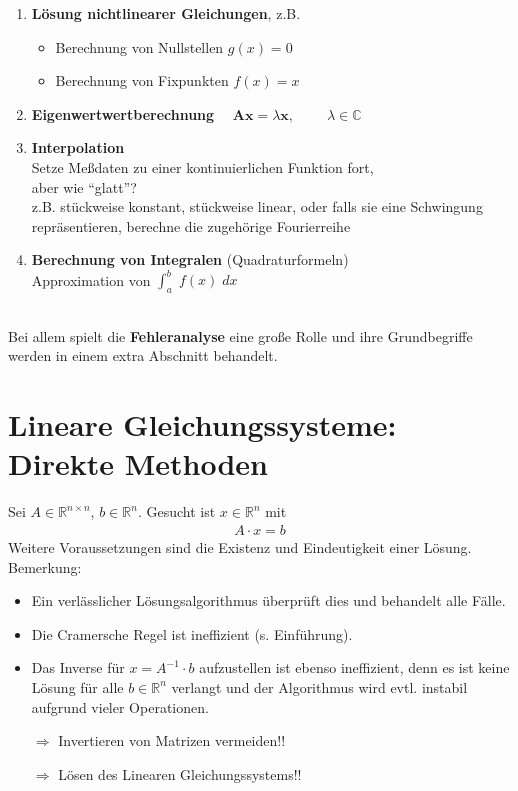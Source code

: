 \documentclass[ngerman,fontsize=11pt, paper=a4, parskip=half, titlepage=true, toc=bib]{scrbook}
\newcommand{\R}{\mathds{R}}
\begin{document}
\begin{enumerate}
  		\item \textbf{Lösung nichtlinearer Gleichungen},
  		z.B.
  		\begin{itemize}
  			\item Berechnung von Nullstellen $g(x) = 0$
  			\item Berechnung von Fixpunkten $f(x) = x$
  			\end{itemize}  
  			\item \textbf{Eigenwertwertberechnung}
  			 $\quad \boldsymbol A \boldsymbol x =   \lambda \boldsymbol x, \qquad \; \lambda \in \mathbb{C}$
  		
  			
  		\item \textbf{Interpolation}\\
  		Setze Meßdaten zu einer kontinuierlichen Funktion fort, \\
  		aber wie \enquote{glatt}?\\
  		z.B. stückweise konstant, stückweise linear, oder 
  		falls sie
  		eine Schwingung repräsentieren, berechne die zugehörige
  		Fourierreihe  
  		
  		\item \textbf{Berechnung von Integralen} (Quadraturformeln) \\ 
  		Approximation von $\int_a^b \; f(x) \; dx$
  	\end{enumerate}~\\
  	
  	Bei allem spielt die \textbf{Fehleranalyse} eine große Rolle und
  	ihre Grundbegriffe werden in einem extra Abschnitt behandelt.
  	

\chapter{Lineare Gleichungssysteme: Direkte Methoden}
Sei $ A \in \R^{n\times n}$, $b \in \R^n$. Gesucht ist $x\in \R^n$ mit 
\begin{gather*}
	A\cdot x = b
\end{gather*}
Weitere Voraussetzungen sind die Existenz und Eindeutigkeit einer Lösung.
Bemerkung:
\begin{itemize}
	\item Ein verlässlicher Lösungsalgorithmus überprüft dies und behandelt alle Fälle. 
	\item Die Cramersche Regel ist ineffizient (s. Einführung).
	\item Das Inverse für $x=A^{-1}\cdot b$ aufzustellen ist ebenso ineffizient, denn es ist keine Lösung für alle $b\in \R^n$ verlangt und der Algorithmus wird evtl. instabil aufgrund vieler Operationen.
	\item [$\Rightarrow$] Invertieren von Matrizen vermeiden!!
	\item [$\Rightarrow$] Lösen des Linearen Gleichungssystems!!
\end{itemize}
\end{document}
